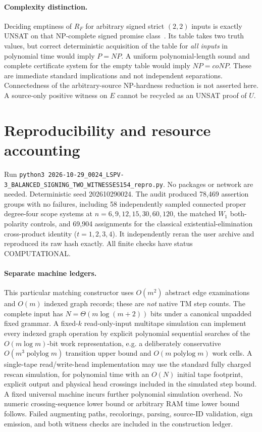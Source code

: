 \documentclass[11pt]{article}
\begin{document}
\paragraph{Complexity distinction.} Deciding emptiness of $R_F$ for arbitrary signed strict $(2,2)$ inputs is exactly UNSAT on that NP-complete signed promise class~\cite{docker}. Its table takes two truth values, but correct deterministic acquisition of the table for \emph{all inputs} in polynomial time would imply $P=NP$. A uniform polynomial-length sound and complete certificate system for the empty table would imply $NP=coNP$. These are immediate standard implications and not independent separations. Connectedness of the arbitrary-source NP-hardness reduction is not asserted here. A source-only positive witness on $E$ cannot be recycled as an UNSAT proof of $U$.

\section{Reproducibility and resource accounting}
Run \texttt{python3 2026-10-29\_0024\_LSPV-3\_BALANCED\_SIGNING\_TWO\_WITNESSES154\_repro.py}. No packages or network are needed. Deterministic seed 202610290024. The audit produced 78,469 assertion groups with no failures, including 58 independently sampled connected proper degree-four scope systems at $n=6,9,12,15,30,60,120$, the matched $W_1$ both-polarity controls, and 69,904 assignments for the classical existential-elimination cross-product identity ($t=1,2,3,4$). It independently reran the user archive and reproduced its raw hash exactly. All finite checks have status COMPUTATIONAL.

\paragraph{Separate machine ledgers.} This particular matching constructor uses $O(m^2)$ abstract edge examinations and $O(m)$ indexed graph records; these are \emph{not} native TM step counts. The complete input has $N=\Theta(m\log(m+2))$ bits under a canonical unpadded fixed grammar. A fixed-$k$ read-only-input multitape simulation can implement every indexed graph operation by explicit polynomial sequential searches of the $O(m\log m)$-bit work representation, e.g. a deliberately conservative $O(m^3\operatorname{polylog}m)$ transition upper bound and $O(m\operatorname{polylog}m)$ work cells. A single-tape read/write-head implementation may use the standard fully charged rescan simulation, for polynomial time with an $O(N)$ initial tape footprint, explicit output and physical head crossings included in the simulated step bound. A fixed universal machine incurs further polynomial simulation overhead. No numeric crossing-sequence lower bound or arbitrary RAM time lower bound follows. Failed augmenting paths, recolorings, parsing, source-ID validation, sign emission, and both witness checks are included in the construction ledger.
\end{document}
